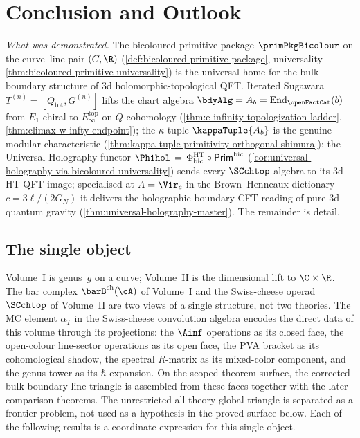\section{Conclusion and Outlook}
\label{sec:conclusion}%
\label{sec:concordance}%

\noindent
\emph{What was demonstrated.}\quad
The bicoloured primitive package
$\primPkgBicolour$
on the curve--line pair $(C, \R)$
\textup(\cref{def:bicoloured-primitive-package},
universality
\cref{thm:bicoloured-primitive-universality}\textup)
is the universal home for the bulk--boundary structure of $3$d
holomorphic-topological QFT. Iterated Sugawara
$T^{(n)} = [Q_{\mathrm{tot}}, G^{(n)}]$ lifts the chart algebra
$\bdyAlg = A_b = \mathrm{End}_{\openFactCat}(b)$ from $E_1$-chiral
to $E_\infty^{\mathrm{top}}$ on $Q$-cohomology
\textup(\cref{thm:e-infinity-topologization-ladder},
\cref{thm:climax-w-infty-endpoint}\textup); the $\kappa$-tuple
$\kappaTuple{A_b}$ is the genuine modular characteristic
\textup(\cref{thm:kappa-tuple-primitivity-orthogonal-shimura}\textup);
the Universal Holography functor
$\Phihol \,=\, \Phi^{\mathrm{HT}}_{\mathrm{bic}} \circ
\mathsf{Prim}^{\mathrm{bic}}$
\textup(\cref{cor:universal-holography-via-bicoloured-universality}\textup)
sends every $\SCchtop$-algebra to its $3$d HT QFT image; specialised
at $A = \Vir_c$ in the Brown--Henneaux dictionary $c = 3 \ell / (2 G_N)$
it delivers the holographic boundary-CFT reading of pure $3$d
quantum gravity \textup(\cref{thm:universal-holography-master}\textup).
The remainder is detail.

\subsection{The single object}

Volume~I is genus~$g$ on a curve; Volume~II is the dimensional
lift to $\C \times \R$. The bar complex
$\barB^{\mathrm{ch}}(\cA)$ of Volume~I and the Swiss-cheese operad
$\SCchtop$ of Volume~II are two views of a single structure, not two theories.
The MC element $\alpha_T$ in the Swiss-cheese convolution algebra
encodes the direct data of this volume through its projections: the
$\Ainf$ operations as its closed face, the open-colour line-sector
operations as its open face, the PVA bracket as its cohomological
shadow, the spectral $R$-matrix as its mixed-color component, and the
genus tower as its $\hbar$-expansion. On the scoped theorem surface,
the corrected bulk-boundary-line triangle is assembled from these
faces together with the later comparison theorems. The unrestricted
all-theory global triangle is separated as a frontier problem, not used
as a hypothesis in the proved surface below. Each of the following
results is a coordinate expression for this single object.

